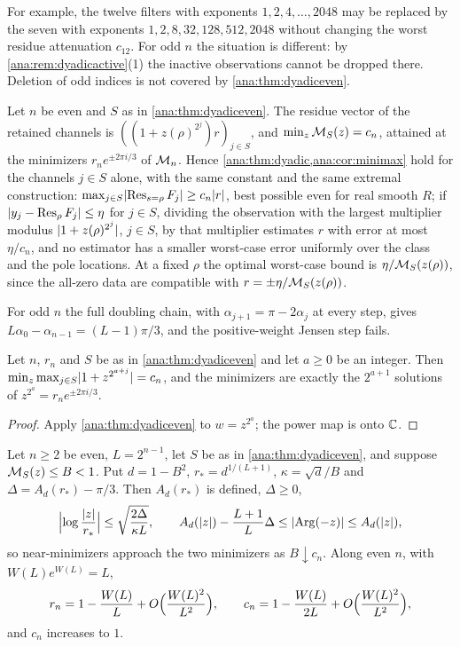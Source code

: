 For example, the twelve filters with exponents $1,2,4,\dots,2048$ may be replaced by the seven
with exponents $1,2,8,32,128,512,2048$ without changing the worst residue attenuation $c_{12}$.
For odd $n$ the situation is different: by \cref{ana:rem:dyadicactive}(1) the inactive
observations cannot be dropped there. Deletion of odd indices is not covered by
\cref{ana:thm:dyadiceven}.

\begin{remark}\label{ana:cor:dyadicdelete}
Let $n$ be even and $S$ as in \cref{ana:thm:dyadiceven}. The residue vector of the retained
channels is $((1+z(\rho)^{2^j})r)_{j\in S}$, and $\min_z\mathcal{M}_S(z)=c_n$, attained at the
minimizers $r_ne^{\pm2\pi i/3}$ of $\mathcal{M}_n$. Hence \cref{ana:thm:dyadic,ana:cor:minimax} hold for the
channels $j\in S$ alone, with the same constant and the same extremal construction:
$\max_{j\in S}\lvert\operatorname{Res}_{s=\rho}F_j\rvert\ge c_n\lvert r\rvert$, best possible even for real smooth $R$; if
$\lvert y_j-\operatorname{Res}_\rho F_j\rvert\le\eta$ for $j\in S$, dividing the observation with the largest
multiplier modulus $\lvert1+z(\rho)^{2^j}\rvert$, $j\in S$, by that multiplier estimates $r$ with
error at most $\eta/c_n$, and no estimator has a smaller worst-case error uniformly over the
class and the pole locations. At a fixed $\rho$ the optimal worst-case bound is
$\eta/\mathcal{M}_S(z(\rho))$, since the all-zero data are compatible with
$r=\pm\eta/\mathcal{M}_S(z(\rho))$.
\end{remark}

For odd $n$ the full doubling chain, with $\alpha_{j+1}=\pi-2\alpha_j$ at every step, gives
$L\alpha_0-\alpha_{n-1}=(L-1)\pi/3$, and the positive-weight Jensen step fails.

\begin{corollary}\label{ana:cor:dyadicshift}
Let $n$, $r_n$ and $S$ be as in \cref{ana:thm:dyadiceven} and let $a\ge0$ be an integer. Then
$\min_z\max_{j\in S}\lvert1+z^{2^{a+j}}\rvert=c_n$, and the minimizers are exactly the $2^{a+1}$
solutions of $z^{2^a}=r_ne^{\pm2\pi i/3}$.
\end{corollary}

\begin{proof}
Apply \cref{ana:thm:dyadiceven} to $w=z^{2^a}$; the power map is onto $\mathbb{C}$.
\end{proof}

\begin{proposition}\label{ana:prop:dyadicstab}
Let $n\ge2$ be even, $L=2^{n-1}$, let $S$ be as in \cref{ana:thm:dyadiceven}, and suppose
$\mathcal{M}_S(z)\le B<1$. Put $d=1-B^2$, $r_*=d^{1/(L+1)}$, $\kappa=\sqrt d/B$ and
$\Delta=A_d(r_*)-\pi/3$. Then $A_d(r_*)$ is defined, $\Delta\ge0$,
\[
 \Bigl|\log\frac{\lvert z\rvert}{r_*}\Bigr|\le\sqrt{\frac{2\Delta}{\kappa L}},\qquad
 A_d(\lvert z\rvert)-\frac{L+1}L\Delta\le\lvert\operatorname{Arg}(-z)\rvert\le A_d(\lvert z\rvert),
\]
so near-minimizers approach the two minimizers as $B\downarrow c_n$. Along even $n$, with
$W(L)e^{W(L)}=L$,
\[
 r_n=1-\frac{W(L)}L+O\Bigl(\frac{W(L)^2}{L^2}\Bigr),\qquad
 c_n=1-\frac{W(L)}{2L}+O\Bigl(\frac{W(L)^2}{L^2}\Bigr),
\]
and $c_n$ increases to $1$.
\end{proposition}

